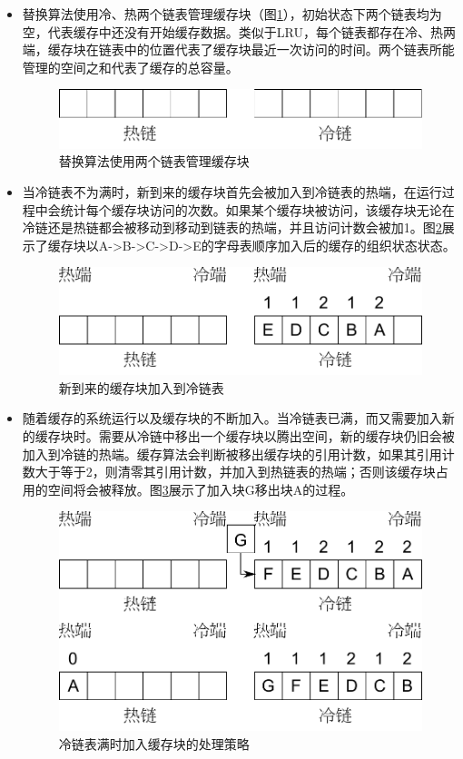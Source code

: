 \begin{itemize}
\item
替换算法使用冷、热两个链表管理缓存块（图\ref{fig:replace-algo-1}），初始状态下两个链表均为空，代表缓存中还没有开始缓存数据。类似于LRU，每个链表都存在冷、热两端，缓存块在链表中的位置代表了缓存块最近一次访问的时间。两个链表所能管理的空间之和代表了缓存的总容量。
\begin{figure}[H]
\centering
\includegraphics[width=0.6\linewidth]{./graph/replace-algo-1}
\caption{替换算法使用两个链表管理缓存块}
\label{fig:replace-algo-1}
\end{figure}

\item
当冷链表不为满时，新到来的缓存块首先会被加入到冷链表的热端，在运行过程中会统计每个缓存块访问的次数。如果某个缓存块被访问，该缓存块无论在冷链还是热链都会被移动到移动到链表的热端，并且访问计数会被加1。图\ref{fig:replace-algo-2}展示了缓存块以A->B->C->D->E的字母表顺序加入后的缓存的组织状态状态。
\begin{figure}[H]
\centering
\includegraphics[width=0.6\linewidth]{./graph/replace-algo-2}
\caption{新到来的缓存块加入到冷链表}
\label{fig:replace-algo-2}
\end{figure}

\item
随着缓存的系统运行以及缓存块的不断加入。当冷链表已满，而又需要加入新的缓存块时。需要从冷链中移出一个缓存块以腾出空间，新的缓存块仍旧会被加入到冷链的热端。缓存算法会判断被移出缓存块的引用计数，如果其引用计数大于等于2，则清零其引用计数，并加入到热链表的热端；否则该缓存块占用的空间将会被释放。图\ref{fig:replace-algo-3}展示了加入块G移出块A的过程。
\begin{figure}[H]
\centering
\includegraphics[width=0.6\linewidth]{./graph/replace-algo-3}
\caption{冷链表满时加入缓存块的处理策略}
\label{fig:replace-algo-3}
\end{figure}


\end{itemize}
